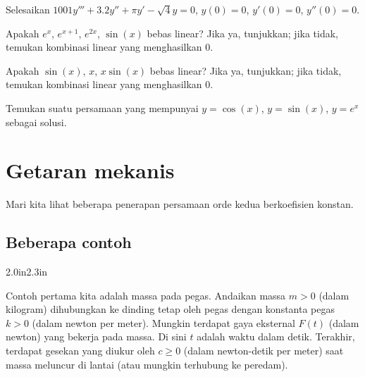 \begin{exercise}
Selesaikan $1001y'''+3.2y''+\pi y'-\sqrt{4} y = 0$, $y(0)=0$, $y'(0) = 0$, $y''(0) = 0$.
\end{exercise}

\begin{exercise}
Apakah $e^{x}$, $e^{x+1}$, $e^{2x}$, $\sin(x)$ bebas linear? Jika ya, tunjukkan; jika tidak, temukan kombinasi linear yang menghasilkan $0$.
\end{exercise}

\begin{exercise}
Apakah $\sin(x)$, $x$, $x\sin(x)$ bebas linear? Jika ya, tunjukkan; jika tidak, temukan kombinasi linear yang menghasilkan $0$.
\end{exercise}

\begin{exercise}
Temukan suatu persamaan yang mempunyai $y=\cos(x)$, $y=\sin(x)$, $y=e^x$ sebagai solusi.
\end{exercise}


\sectionnewpage
\section{Getaran mekanis} \label{sec:mv}



Mari kita lihat beberapa penerapan persamaan orde kedua berkoefisien konstan.

\subsection{Beberapa contoh}

\begin{mywrapfigsimp}{2.0in}{2.3in}
\noindent
{}
\end{mywrapfigsimp}
Contoh pertama kita adalah massa pada pegas. Andaikan massa $m > 0$ (dalam kilogram) dihubungkan ke dinding tetap oleh pegas dengan konstanta pegas $k > 0$ (dalam newton per meter). Mungkin terdapat gaya eksternal $F(t)$ (dalam newton) yang bekerja pada massa. Di sini $t$ adalah waktu dalam detik. Terakhir, terdapat gesekan yang diukur oleh $c \geq 0$ (dalam newton-detik per meter) saat massa meluncur di lantai (atau mungkin terhubung ke peredam).

